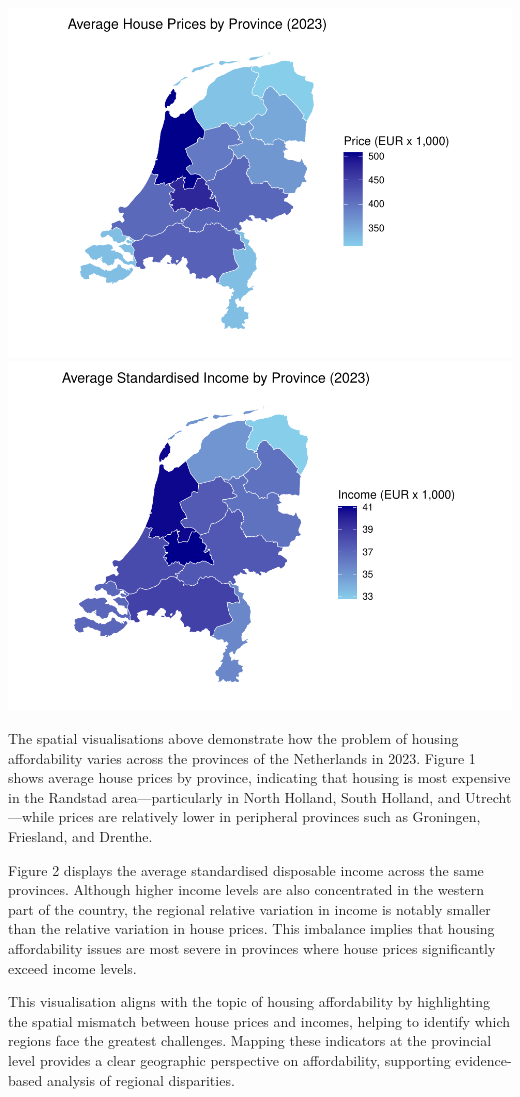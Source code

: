 \documentclass[
]{article}
\begin{document}
\includegraphics[width=0.52\linewidth,height=0.3\textheight]{rMarkdownProgrammingForEconomistsTutorial1Group6_files/figure-latex/visualise spatial variation-1}
\includegraphics[width=0.52\linewidth,height=0.3\textheight]{rMarkdownProgrammingForEconomistsTutorial1Group6_files/figure-latex/visualise spatial variation-2}

The spatial visualisations above demonstrate how the problem of housing
affordability varies across the provinces of the Netherlands in 2023.
Figure 1 shows average house prices by province, indicating that housing
is most expensive in the Randstad area---particularly in North Holland,
South Holland, and Utrecht---while prices are relatively lower in
peripheral provinces such as Groningen, Friesland, and Drenthe.

Figure 2 displays the average standardised disposable income across the
same provinces. Although higher income levels are also concentrated in
the western part of the country, the regional relative variation in
income is notably smaller than the relative variation in house prices.
This imbalance implies that housing affordability issues are most severe
in provinces where house prices significantly exceed income levels.

This visualisation aligns with the topic of housing affordability by
highlighting the spatial mismatch between house prices and incomes,
helping to identify which regions face the greatest challenges. Mapping
these indicators at the provincial level provides a clear geographic
perspective on affordability, supporting evidence-based analysis of
regional disparities.
\end{document}
